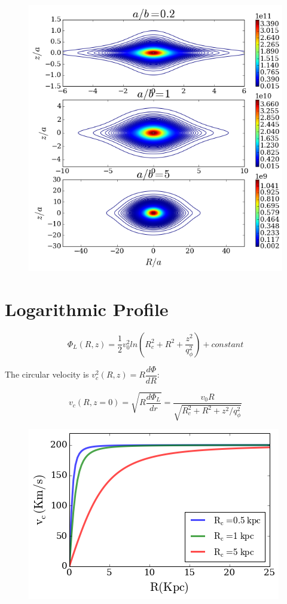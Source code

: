 \begin{figure}[H]\label{fig:MN_density}
\centering
\includegraphics[scale=0.7]{../figures/MN_density_contours.png}
\end{figure}

\section{Logarithmic Profile}\label{sec:log}

\begin{equation}
\Phi_L(R, z) = \dfrac{1}{2} v_0^2 ln \left( R_c^2 + R^2 + \dfrac{z^2}{q_{\phi}^2}  \right) + constant
\end{equation}

The circular velocity is $v_c^2(R, z) = R \dfrac{d \Phi}{dR}$:

\begin{equation}
v_c(R, z=0) =\sqrt{ R \dfrac{d \Phi_L}{dr}} = \dfrac{v_0 R}{\sqrt{R_c^2 + R^2 + z^2/q_{\phi}^2}}
\end{equation}

\begin{figure}[H]
\centering
\includegraphics[scale=0.7]{../figures/Log_vc.png}
\end{figure}

